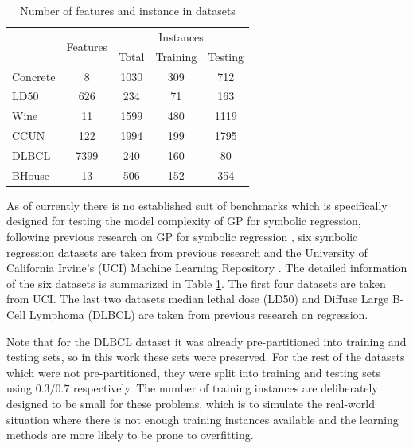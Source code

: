 \documentclass[conference]{IEEEtran}
\begin{document}
\begin{table}[!ht]
	\scriptsize
	\caption{Number of features and instance in datasets}
	\label{tab:realworlddatasets}
	\centering
\begin{tabular}{|l|c|c|c|c|}
\hline
\multirow{2}{*}{} & \multirow{2}{*}{Features} & \multicolumn{3}{c|}{Instances} \\ \cline{3-5} 
                  &                           & Total   & Training  & Testing  \\ \hline
Concrete          & 8                         & 1030    & 309       & 712      \\
LD50              & 626                       & 234     & 71        & 163      \\
Wine              & 11                        & 1599    & 480       & 1119     \\
CCUN              & 122                       & 1994    & 199       & 1795     \\
DLBCL             & 7399                      & 240     & 160       & 80       \\ 
BHouse            & 13                        & 506     & 152       & 354      \\ 
\hline
\end{tabular}
\end{table}

As of currently there is no established suit of benchmarks which is specifically designed for testing the model complexity of GP for symbolic regression, following previous research on GP for symbolic regression \cite{b7, b17},  six symbolic regression datasets are taken from previous research and the University of California Irvine's (UCI) Machine Learning Repository \cite{b21}. The detailed information of the six datasets is summarized in Table \ref{tab:realworlddatasets}. The first four datasets are taken from UCI. The last two datasets median lethal dose (LD50) \cite{b22} and  Diffuse Large B-Cell Lymphoma (DLBCL) \cite{b23} are taken from previous research on regression.

Note that for the DLBCL dataset it was already pre-partitioned into training and testing sets, so in this work these sets were preserved. For the rest of the datasets which were not pre-partitioned, they were split into training and testing sets using $0.3/0.7$ respectively. The number of training instances are deliberately designed to be small for these problems, which is to simulate the real-world situation where there is not enough training instances available and the learning methods are more likely to be prone to overfitting. 
\end{document}
